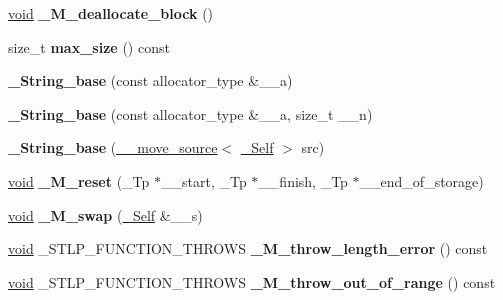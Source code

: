 \begin{DoxyCompactItemize}
\mbox{\label{class___string__base_ae2197bb8e57b9c3b32352d1778897bec}} 
\hyperlink{interfacevoid}{void} {\bfseries \+\_\+\+M\+\_\+deallocate\+\_\+block} ()
\item 
\mbox{\label{class___string__base_a19513f7138a2c50b71ddb6eb82e2b863}} 
size\+\_\+t {\bfseries max\+\_\+size} () const
\item 
\mbox{\label{class___string__base_a839bfaeac01a1c2109e948a2dddf947a}} 
{\bfseries \+\_\+\+String\+\_\+base} (const allocator\+\_\+type \&\+\_\+\+\_\+a)
\item 
\mbox{\label{class___string__base_aca377e253ffaa619e31669e6110aee0e}} 
{\bfseries \+\_\+\+String\+\_\+base} (const allocator\+\_\+type \&\+\_\+\+\_\+a, size\+\_\+t \+\_\+\+\_\+n)
\item 
\mbox{\label{class___string__base_a675ee63bb72ef6d967a493e2ab5aa967}} 
{\bfseries \+\_\+\+String\+\_\+base} (\hyperlink{class____move__source}{\+\_\+\+\_\+move\+\_\+source}$<$ \hyperlink{class___string__base}{\+\_\+\+Self} $>$ src)
\item 
\mbox{\label{class___string__base_a80227ab0df8c8a2b8ba5a15aa7b3a6aa}} 
\hyperlink{interfacevoid}{void} {\bfseries \+\_\+\+M\+\_\+reset} (\+\_\+\+Tp $\ast$\+\_\+\+\_\+start, \+\_\+\+Tp $\ast$\+\_\+\+\_\+finish, \+\_\+\+Tp $\ast$\+\_\+\+\_\+end\+\_\+of\+\_\+storage)
\item 
\mbox{\label{class___string__base_a094ca262bf02b0f6004fd2305a0eab7e}} 
\hyperlink{interfacevoid}{void} {\bfseries \+\_\+\+M\+\_\+swap} (\hyperlink{class___string__base}{\+\_\+\+Self} \&\+\_\+\+\_\+s)
\item 
\mbox{\label{class___string__base_acb2f3acda040b0c077c68d1152ecd700}} 
\hyperlink{interfacevoid}{void} \+\_\+\+S\+T\+L\+P\+\_\+\+F\+U\+N\+C\+T\+I\+O\+N\+\_\+\+T\+H\+R\+O\+WS {\bfseries \+\_\+\+M\+\_\+throw\+\_\+length\+\_\+error} () const
\item 
\mbox{\label{class___string__base_a5c3922bee75d31c6304ef9f71a433174}} 
\hyperlink{interfacevoid}{void} \+\_\+\+S\+T\+L\+P\+\_\+\+F\+U\+N\+C\+T\+I\+O\+N\+\_\+\+T\+H\+R\+O\+WS {\bfseries \+\_\+\+M\+\_\+throw\+\_\+out\+\_\+of\+\_\+range} () const
\end{DoxyCompactItemize}
